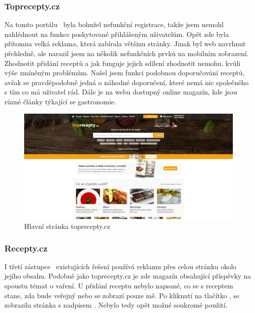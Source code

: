 \subsubsection{Toprecepty.cz}

Na tomto portálu~\cite{TopreceptyCZ} byla bohužel nefunkční registrace, takže jsem nemohl nahlédnout na funkce poskytované přihlášeným
uživatelům. Opět zde byla přítomna velká reklama, která zabírala většinu stránky. Jinak byl web navrhnut přehledně,
ale narazil jsem na několik nefunkčních prvků na mobilním zobrazení. Zhodnotit přidání receptů a jak funguje jejich
sdílení zhodnotit nemohu, kvůli výše zmíněným problémům. Našel jsem funkci podobnou doporučování receptů, avšak se
pravděpodobně jedná o náhodné doporučení, které nemá nic společného s tím co má uživatel rád. Dále je na webu dostupný
online magazín, kde jsou různé články týkající se gastronomie.

\begin{figure}[H]
    \includegraphics[width=\textwidth]{images/topreceptycz-uvodni-stranka}
    \caption{Hlavní stránka toprecepty.cz} \label{picture:topreceptycz:uvodni-stranka}
\end{figure}

\subsubsection{Recepty.cz}

I třetí zástupce~\cite{ReceptyCZ} existujících řešení používá reklamu přes celou stránku okolo jejího obsahu. Podobně jako toprecepty.cz
je zde magazín obsahující příspěvky na spoustu témat o vaření. U přidání receptu nebylo napsané, co se s receptem stane,
zda bude veřejný nebo se zobrazí pouze mě. Po kliknutí na tlačítko , se zobrazila stránka s nadpisem
. Nebylo tedy opět možné soukromé použití.

